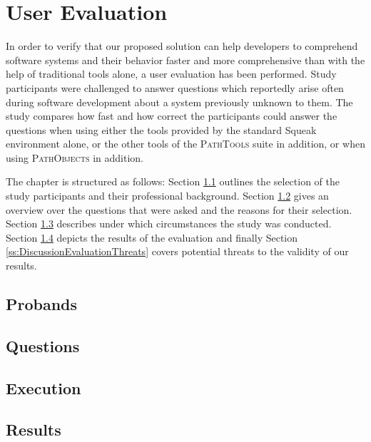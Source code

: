 \clearpage
\section{User Evaluation}
\label{s:DiscussionEvaluation}
In order to verify that our proposed solution can help developers to comprehend software systems and their behavior faster and more comprehensive than with the help of traditional tools alone, a user evaluation has been performed.
Study participants were challenged to answer questions which reportedly arise often during software development about a system previously unknown to them.
The study compares how fast and how correct the participants could answer the questions  when using either the tools provided by the standard Squeak environment alone, or the other tools of the \textsc{PathTools} suite in addition, or when using \textsc{PathObjects} in addition.

The chapter is structured as follows:
Section \ref{ss:DiscussionEvaluationParticipants} outlines the selection of the study participants and their professional background.
Section \ref{ss:DiscussionEvaluationQuestions} gives an overview over the questions that were asked and the reasons for their selection.
Section \ref{ss:DiscussionEvaluationExecution} describes under which circumstances the study was conducted.
Section \ref{ss:DiscussionEvaluationResults} depicts the results of the evaluation and finally Section \ref{ss:DiscussionEvaluationThreats} covers potential threats to the validity of our results.

\subsection{Probands}
\label{ss:DiscussionEvaluationParticipants}

\subsection{Questions}
\label{ss:DiscussionEvaluationQuestions}

\subsection{Execution}
\label{ss:DiscussionEvaluationExecution}

\subsection{Results}
\label{ss:DiscussionEvaluationResults}

